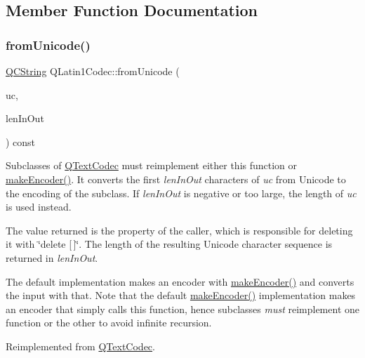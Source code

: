 \subsection{Member Function Documentation}
\mbox{\label{class_q_latin1_codec_abb7f6a1587cc16a1641ce366dbdb3b52}} 
\subsubsection{\texorpdfstring{fromUnicode()}{fromUnicode()}}
{\footnotesize\ttfamily \mbox{\hyperlink{class_q_c_string}{Q\+C\+String}} Q\+Latin1\+Codec\+::from\+Unicode (\begin{DoxyParamCaption}\item[{const \mbox{\hyperlink{class_q_string}{Q\+String}} \&}]{uc,  }\item[{int \&}]{len\+In\+Out }\end{DoxyParamCaption}) const\hspace{0.3cm}{\ttfamily [virtual]}}

Subclasses of \mbox{\hyperlink{class_q_text_codec}{Q\+Text\+Codec}} must reimplement either this function or \mbox{\hyperlink{class_q_text_codec_aa7dccd7fc1b578de0b7599b040d98e11}{make\+Encoder()}}. It converts the first {\itshape len\+In\+Out} characters of {\itshape uc} from Unicode to the encoding of the subclass. If {\itshape len\+In\+Out} is negative or too large, the length of {\itshape uc} is used instead.

The value returned is the property of the caller, which is responsible for deleting it with \char`\"{}delete \mbox{[}$\,$\mbox{]}\char`\"{}. The length of the resulting Unicode character sequence is returned in {\itshape len\+In\+Out}.

The default implementation makes an encoder with \mbox{\hyperlink{class_q_text_codec_aa7dccd7fc1b578de0b7599b040d98e11}{make\+Encoder()}} and converts the input with that. Note that the default \mbox{\hyperlink{class_q_text_codec_aa7dccd7fc1b578de0b7599b040d98e11}{make\+Encoder()}} implementation makes an encoder that simply calls this function, hence subclasses {\itshape must} reimplement one function or the other to avoid infinite recursion. 

Reimplemented from \mbox{\hyperlink{class_q_text_codec_a564dc8bf15241a165a38287c1d26e48c}{Q\+Text\+Codec}}.


